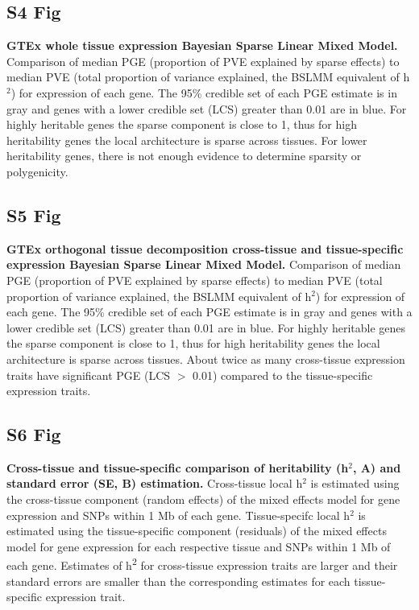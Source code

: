 \documentclass[10pt,letterpaper]{article}
\begin{document}
\subsection*{S4 Fig}
\label{S4_Fig}
{\bf GTEx whole tissue expression Bayesian Sparse Linear Mixed Model.} Comparison of median PGE (proportion of PVE explained by sparse effects) to median PVE (total proportion of variance explained, the BSLMM equivalent of h$^2$) for expression of each gene. The 95\% credible set of each PGE estimate is in gray and genes with a lower credible set (LCS) greater than 0.01 are in blue. For highly heritable genes the sparse component is close to 1, thus for high heritability genes the local architecture is sparse across tissues. For lower heritability genes, there is not enough evidence to determine sparsity or polygenicity. 

\subsection*{S5 Fig}
\label{S5_Fig}
{\bf GTEx orthogonal tissue decomposition cross-tissue and tissue-specific expression Bayesian Sparse Linear Mixed Model.} Comparison of median PGE (proportion of PVE explained by sparse effects) to median PVE (total proportion of variance explained, the BSLMM equivalent of h$^2$) for expression of each gene. The 95\% credible set of each PGE estimate is in gray and genes with a lower credible set (LCS) greater than 0.01 are in blue. For highly heritable genes the sparse component is close to 1, thus for high heritability genes the local architecture is sparse across tissues. About twice as many cross-tissue expression traits have significant PGE (LCS $>$ 0.01) compared to the tissue-specific expression traits.

\subsection*{S6 Fig}
\label{S6_Fig}
{\bf Cross-tissue and tissue-specific comparison of heritability (h$^2$, A) and standard error (SE, B) estimation.} Cross-tissue local h$^2$ is estimated using the cross-tissue component (random effects) of the mixed effects model for gene expression and SNPs within 1 Mb of each gene. Tissue-specifc local h$^2$ is estimated using the tissue-specific component (residuals) of the mixed effects model for gene expression for each respective tissue and SNPs within 1 Mb of each gene. Estimates of h\textsuperscript{2} for cross-tissue expression traits are larger and their standard errors are smaller than the corresponding estimates for each tissue-specific expression trait.
\end{document}
